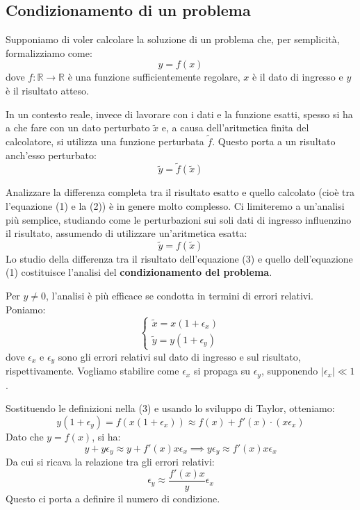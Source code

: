 \subsection{Condizionamento di un problema}
Supponiamo di voler calcolare la soluzione di un problema che, per semplicità, formalizziamo come:
\begin{equation}
    y = f(x)
\end{equation}
dove $f: \mathbb{R} \to \mathbb{R}$ è una funzione sufficientemente regolare, $x$ è il dato di ingresso e $y$ è il risultato atteso.

In un contesto reale, invece di lavorare con i dati e la funzione esatti, spesso si ha a che fare con un dato perturbato $\tilde{x}$ e, a causa dell'aritmetica finita del calcolatore, si utilizza una funzione perturbata $\tilde{f}$. Questo porta a un risultato anch'esso perturbato:
\begin{equation}
    \tilde{y} = \tilde{f}(\tilde{x})
\end{equation}

\begin{osservazione}
Analizzare la differenza completa tra il risultato esatto e quello calcolato (cioè tra l'equazione (1) e la (2)) è in genere molto complesso. Ci limiteremo a un'analisi più semplice, studiando come le perturbazioni sui soli dati di ingresso influenzino il risultato, assumendo di utilizzare un'aritmetica esatta:
\begin{equation}
    \tilde{y} = f(\tilde{x})
\end{equation}
Lo studio della differenza tra il risultato dell'equazione (3) e quello dell'equazione (1) costituisce l'analisi del \textbf{condizionamento del problema}.
\end{osservazione}

Per $y \neq 0$, l'analisi è più efficace se condotta in termini di errori relativi. Poniamo:
\[
\begin{cases}
    \tilde{x} = x(1 + \epsilon_x) \\
    \tilde{y} = y(1 + \epsilon_y)
\end{cases}
\]
dove $\epsilon_x$ e $\epsilon_y$ sono gli errori relativi sul dato di ingresso e sul risultato, rispettivamente. Vogliamo stabilire come $\epsilon_x$ si propaga su $\epsilon_y$, supponendo $|\epsilon_x| \ll 1$.

Sostituendo le definizioni nella (3) e usando lo sviluppo di Taylor, otteniamo:
$$ y(1 + \epsilon_y) = f(x(1+\epsilon_x)) \approx f(x) + f'(x) \cdot (x \epsilon_x) $$
Dato che $y = f(x)$, si ha:
$$ y + y \epsilon_y \approx y + f'(x) x \epsilon_x \implies y \epsilon_y \approx f'(x) x \epsilon_x $$
Da cui si ricava la relazione tra gli errori relativi:
$$ \epsilon_y \approx \frac{f'(x)x}{y} \epsilon_x $$
Questo ci porta a definire il numero di condizione.

